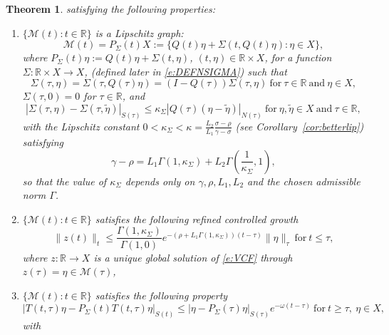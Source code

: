 \documentclass[a4paper,11pt,reqno]{amsart}
\theoremstyle{plain}
\newtheorem{thm}[lem]{Theorem}
\theoremstyle{definition}
\numberwithin{equation}{section}
\newcommand{\R}{\mathbb{R}}
\renewcommand{\geq}{\geqslant}
\renewcommand{\leq}{\leqslant}
\begin{document}
\begin{thm}
satisfying the following properties:
\begin{enumerate}
    \item[(I)] $\{\mathcal{M}(t)\colon t\in \R\}$ is a Lipschitz graph:
    $$\mathcal{M}(t)=P_\Sigma(t)X:=\{Q(t)\eta+\Sigma(t,Q(t)\eta)\colon \eta\in X\},$$ 
    where {$P_\Sigma(t)\eta:=Q(t)\eta+\Sigma(t,\eta)$, $(t,\eta)\in\mathbb{R}\times X$,} for a function
$\Sigma\colon\mathbb{R}\times X \to X$, (defined later in \eqref{e:DEFNSIGMA}) such that
$$\Sigma(\tau,\eta)=\Sigma(\tau,Q(\tau)\eta)=(I-Q(\tau))\Sigma(\tau,\eta)\ \text{for}\ \tau\in\R\ \text{and}\ \eta\in X,$$
	 $\Sigma(\tau,0)=0$ for $\tau\in\R$, and
	\begin{equation*}
		|\Sigma(\tau,\eta)-\Sigma(\tau,\tilde\eta)|_{S(\tau)}\leq\kappa_\Sigma|Q(\tau)(\eta-\tilde\eta)|_{N(\tau)}\ \text{for}\  \eta,\tilde\eta\in X\ \text{and}\ \tau\in\R,
	\end{equation*}
	with the Lipschitz constant $0<\kappa_\Sigma<\kappa = \frac{L_2}{L_1}\frac{\sigma-\rho}{\gamma-\sigma}$ (see Corollary~\ref{cor:betterlip})
	 satisfying
\begin{equation*}
\gamma-\rho=L_1\Gamma(1,\kappa_\Sigma)+L_2\Gamma\left(\frac{1}{\kappa_\Sigma},1\right),
\end{equation*} 	
so that the value of $\kappa_\Sigma$ depends only on $\gamma, \rho, L_1, L_2$ and the chosen admissible norm $\Gamma$.
\item[(II)] $\{\mathcal{M}(t)\colon t\in \R\}$ satisfies the following refined controlled growth
{
    \begin{equation*}%
    \|z(t)\|_t \leq \frac{\Gamma(1,\kappa_\Sigma)}{\Gamma(1,0)}e^{-(\rho+L_1 \Gamma(1,\kappa_\Sigma))(t-\tau)}\|\eta\|_\tau\  \text{for}\ t\leq\tau,
    \end{equation*}
    where $z\colon\R\to X$ is a unique global solution of \eqref{e:VCF} through $z(\tau)=\eta\in\mathcal{M}(\tau)$,}
    \item[(III)] $\{\mathcal{M}(t)\colon t\in \R\}$ satisfies the following  property
$$|T(t,\tau)\eta-P_\Sigma(t)T(t,\tau)\eta|_{S(t)}\leq |\eta-P_\Sigma(\tau)\eta|_{S(\tau)}e^{-\omega(t-\tau)}\ \text{for}\  t\geq\tau,\ \eta\in X,$$
with
\begin{equation*}

\end{equation*}
\end{enumerate}
\end{thm}
\end{document}
